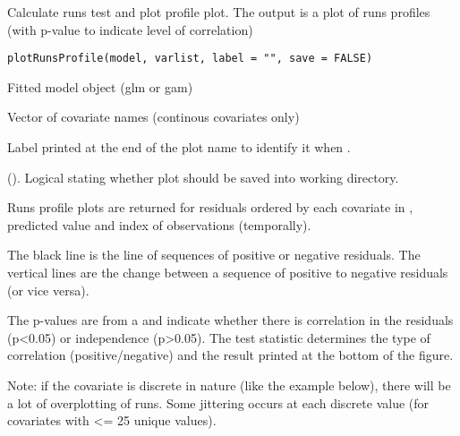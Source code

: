 \documentclass[a4paper]{book}
\begin{document}
%
\begin{Description}\relax
Calculate runs test and plot profile plot.  The output is a plot of runs profiles (with p-value to indicate level of correlation)
\end{Description}
%
\begin{Usage}
\begin{verbatim}
plotRunsProfile(model, varlist, label = "", save = FALSE)
\end{verbatim}
\end{Usage}
%
\begin{Arguments}
\begin{ldescription}
\item[\code{model}] Fitted model object (glm or gam)

\item[\code{varlist}] Vector of covariate names (continous covariates only)

\item[\code{label}] Label printed at the end of the plot name to identify it when .

\item[\code{save}] (). Logical stating whether plot should be saved into working directory.
\end{ldescription}
\end{Arguments}
%
\begin{Value}
Runs profile plots are returned for residuals ordered by each covariate in , predicted value and index of observations (temporally).

The black line is the line of sequences of positive or negative residuals.  The vertical lines are the change between a sequence of positive to negative residuals (or vice versa).

The p-values are from a  and indicate whether there is correlation in the residuals (p<0.05) or independence (p>0.05).  The test statistic determines the type of correlation (positive/negative) and the result printed at the bottom of the figure. 

Note: if the covariate is discrete in nature (like the example below), there will be a lot of overplotting of runs.  Some jittering occurs at each discrete value (for covariates with <= 25 unique values).
\end{Value}
\end{document}
